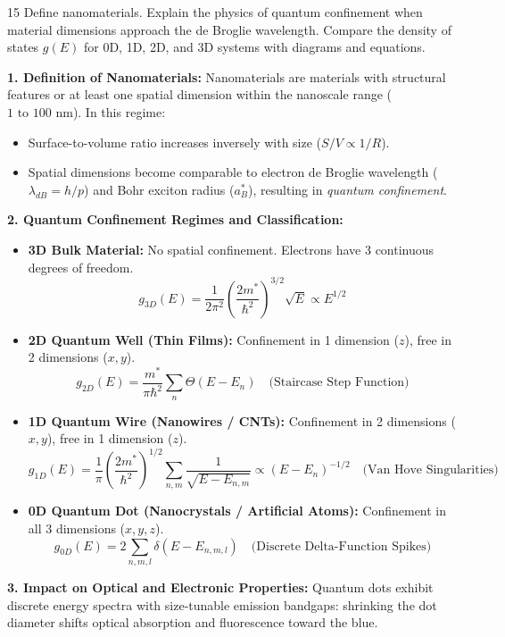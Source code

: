 \begin{theoryq}{15}
Define nanomaterials. Explain the physics of quantum confinement when material dimensions approach the de Broglie wavelength. Compare the density of states $g(E)$ for 0D, 1D, 2D, and 3D systems with diagrams and equations.
\end{theoryq}
\begin{theorysol}
\textbf{1. Definition of Nanomaterials:}
Nanomaterials are materials with structural features or at least one spatial dimension within the nanoscale range ($1\text{ to }100\text{ nm}$). In this regime:
\begin{itemize}
\item Surface-to-volume ratio increases inversely with size ($S/V \propto 1/R$).
\item Spatial dimensions become comparable to electron de Broglie wavelength ($\lambda_{dB} = h/p$) and Bohr exciton radius ($a_B^*$), resulting in \textit{quantum confinement}.
\end{itemize}

\textbf{2. Quantum Confinement Regimes and Classification:}
\begin{itemize}
\item \textbf{3D Bulk Material:} No spatial confinement. Electrons have 3 continuous degrees of freedom.
\begin{equation}
g_{3D}(E) = \frac{1}{2\pi^2}\left(\frac{2m^*}{\hbar^2}\right)^{3/2} \sqrt{E} \propto E^{1/2}
\end{equation}
\item \textbf{2D Quantum Well (Thin Films):} Confinement in 1 dimension ($z$), free in 2 dimensions ($x,y$).
\begin{equation}
g_{2D}(E) = \frac{m^*}{\pi \hbar^2} \sum_n \Theta(E - E_n)\quad \text{(Staircase Step Function)}
\end{equation}
\item \textbf{1D Quantum Wire (Nanowires / CNTs):} Confinement in 2 dimensions ($x,y$), free in 1 dimension ($z$).
\begin{equation}
g_{1D}(E) = \frac{1}{\pi}\left(\frac{2m^*}{\hbar^2}\right)^{1/2} \sum_{n,m} \frac{1}{\sqrt{E - E_{n,m}}} \propto (E - E_n)^{-1/2}\quad \text{(Van Hove Singularities)}
\end{equation}
\item \textbf{0D Quantum Dot (Nanocrystals / Artificial Atoms):} Confinement in all 3 dimensions ($x,y,z$).
\begin{equation}
g_{0D}(E) = 2 \sum_{n,m,l} \delta(E - E_{n,m,l})\quad \text{(Discrete Delta-Function Spikes)}
\end{equation}
\end{itemize}

\textbf{3. Impact on Optical and Electronic Properties:}
Quantum dots exhibit discrete energy spectra with size-tunable emission bandgaps: shrinking the dot diameter shifts optical absorption and fluorescence toward the blue.
\end{theorysol}
\vspace{4mm}

